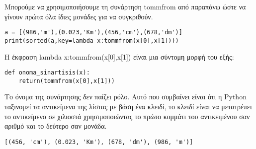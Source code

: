 Μπορούμε να χρησιμοποιήσουμε τη συνάρτηση tommfrom από παραπάνω ώστε να γίνουν πρώτα όλα ίδιες μονάδες για να συγκριθούν.
\begin{lstlisting}
a = [(986,'m'),(0.023,'Km'),(456,'cm'),(678,'dm')]
print(sorted(a,key=lambda x:tommfrom(x[0],x[1])))
\end{lstlisting}
Η έκφραση lambda x:tommfrom(x[0],x[1]) είναι μια σύντομη μορφή του εξής:
\begin{lstlisting}
def onoma_sinartisis(x):
    return(tommfrom(x[0],x[1]))
\end{lstlisting}
Το όνομα της συνάρτησης δεν παίζει ρόλο.
Αυτό που συμβαίνει είναι ότι η Python ταξινομεί τα αντικείμενα της λίστας με βάση ένα κλειδί, το κλειδί είναι να μετατρέπει το αντικείμενο σε χιλιοστά χρησιμοποιώντας το πρώτο κομμάτι του αντικειμένου σαν αριθμό και το δεύτερο σαν μονάδα.
\begin{lstlisting}
[(456, 'cm'), (0.023, 'Km'), (678, 'dm'), (986, 'm')]
\end{lstlisting}
